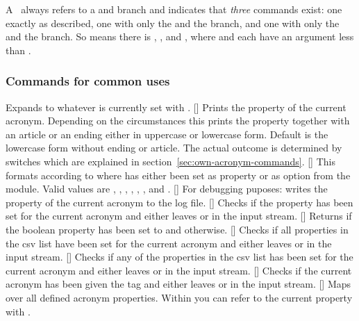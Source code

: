 \documentclass{acro-manual}
\begin{document}
A \TF\ always refers to a  and  branch and indicates
that \emph{three} commands exist: one exactly as described, one with only the
\code{\textcolor{cs}{T}} and the  branch, and one with only the
\code{\textcolor{cs}{F}} and the  branch.  So  means
there is , , and , where 
and  each have an argument less than .

\subsubsection{Commands for common uses}
\begin{commands}
  \expandable{}
    Expands to whatever is currently set with
    \code{/}.
  []
    Prints the property  of the current acronym.  Depending on
    the circumstances this prints the property together with an article or an
    ending either in uppercase or lowercase form.  Default is the lowercase
    form without ending or article. The actual outcome is determined by
    switches which are explained in section~\vref{sec:own-acronym-commands}.
  []
    This formats  according to  where  has
    either been set as property or as option from the  module.
    Valid values are , , , ,
    , , and .
  []
    For debugging puposes: writes the property  of the current
    acronym to the log file.
  []
    Checks if the property  has been set for the current
    acronym and either leaves  or  in the input stream.
  []
    Returns  if the boolean property
     has been set to  and  otherwise.
  []
    Checks if all properties in the csv list  have been set
    for the current acronym and either leaves  or  in
    the input stream.
  []
    Checks if any of the properties in the csv list  has been
    set for the current acronym and either leaves  or 
    in the input stream.
  []
    Checks if the current acronym has been given the tag  and either
    leaves  or  in the input stream.
  []
    Maps over all defined acronym properties.  Within  you can
    refer to the current property with .
\end{commands}
\end{document}
